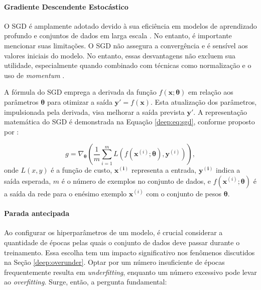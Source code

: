 \paragraph{Gradiente Descendente Estocástico}
\label{deep:optimization:sgd}
O SGD é amplamente adotado devido à sua eficiência em modelos de aprendizado profundo e conjuntos de dados em larga escala \citep{Goodfellow2016}. No entanto, é importante mencionar suas limitações. O SGD não assegura a convergência e é sensível aos valores iniciais do modelo. No entanto, essas desvantagens não excluem sua utilidade, especialmente quando combinado com técnicas como normalização e o uso de \textit{momentum} \citep{Goodfellow2016}.

A fórmula do SGD emprega a derivada da função $f(\boldsymbol{x}; \boldsymbol{\theta})$ em relação aos parâmetros $\boldsymbol{\theta}$ para otimizar a saída $\boldsymbol{y'} = f(\boldsymbol{x})$. Esta atualização dos parâmetros, impulsionada pela derivada, visa melhorar a saída prevista $\boldsymbol{y'}$. A representação matemática do SGD é demonstrada na Equação \ref{deep:eq:sgd}, conforme proposto por \cite{Goodfellow2016}:

\begin{equation}
\label{deep:eq:sgd}
g = \nabla_{\boldsymbol{\theta}} \left(\frac{1}{m} \sum\limits_{i=1}^{m}L(f(\boldsymbol{x}^{(i)}; \boldsymbol{\theta}), \mathbf{y}^{(i)})\right),
\end{equation}
onde $L(x,y)$ é a função de custo, $\boldsymbol{x^{(i)}}$ representa a entrada, $\boldsymbol{y^{(i)}}$ indica a saída esperada, $m$ é o número de exemplos no conjunto de dados, e $f(\boldsymbol{x}^{(i)}; \boldsymbol{\theta})$ é a saída da rede para o enésimo exemplo $\boldsymbol{x}^{(i)}$ com o conjunto de pesos $\boldsymbol{\theta}$.

\paragraph{Parada antecipada}
\label{deep:optimization:early_stoping}

Ao configurar os hiperparâmetros de um modelo, é crucial considerar a quantidade de épocas pelas quais o conjunto de dados deve passar durante o treinamento. Essa escolha tem um impacto significativo nos fenômenos discutidos na Seção \ref{deep:overunder}. Optar por um número insuficiente de épocas frequentemente resulta em \textit{underfitting}, enquanto um número excessivo pode levar ao \textit{overfitting}. Surge, então, a pergunta fundamental: 


